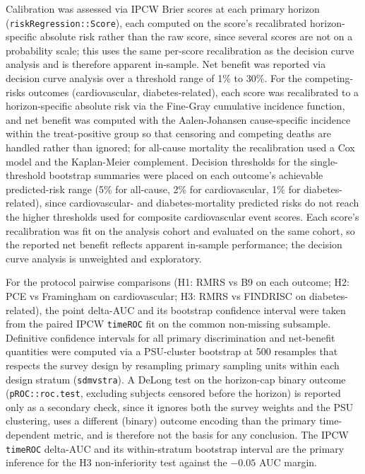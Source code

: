 \documentclass[11pt]{article}
\begin{document}
Calibration was assessed via IPCW Brier scores at each primary horizon (\texttt{riskRegression::Score}), each computed on the score's recalibrated horizon-specific absolute risk rather than the raw score, since several scores are not on a probability scale; this uses the same per-score recalibration as the decision curve analysis and is therefore apparent in-sample. Net benefit was reported via decision curve analysis \citep{vickers2006dca} over a threshold range of 1\% to 30\%. For the competing-risks outcomes (cardiovascular, diabetes-related), each score was recalibrated to a horizon-specific absolute risk via the Fine-Gray cumulative incidence function, and net benefit was computed with the Aalen-Johansen cause-specific incidence within the treat-positive group so that censoring and competing deaths are handled rather than ignored; for all-cause mortality the recalibration used a Cox model and the Kaplan-Meier complement. Decision thresholds for the single-threshold bootstrap summaries were placed on each outcome's achievable predicted-risk range (5\% for all-cause, 2\% for cardiovascular, 1\% for diabetes-related), since cardiovascular- and diabetes-mortality predicted risks do not reach the higher thresholds used for composite cardiovascular event scores. Each score's recalibration was fit on the analysis cohort and evaluated on the same cohort, so the reported net benefit reflects apparent in-sample performance; the decision curve analysis is unweighted and exploratory.

For the protocol pairwise comparisons (H1: RMRS vs B9 on each outcome; H2: PCE vs Framingham on cardiovascular; H3: RMRS vs FINDRISC on diabetes-related), the point delta-AUC and its bootstrap confidence interval were taken from the paired IPCW \texttt{timeROC} fit on the common non-missing subsample. Definitive confidence intervals for all primary discrimination and net-benefit quantities were computed via a PSU-cluster bootstrap at 500 resamples that respects the survey design by resampling primary sampling units within each design stratum (\texttt{sdmvstra}). A DeLong test on the horizon-cap binary outcome (\texttt{pROC::roc.test}, excluding subjects censored before the horizon) is reported only as a secondary check, since it ignores both the survey weights and the PSU clustering, uses a different (binary) outcome encoding than the primary time-dependent metric, and is therefore not the basis for any conclusion. The IPCW \texttt{timeROC} delta-AUC and its within-stratum bootstrap interval are the primary inference for the H3 non-inferiority test against the $-0.05$ AUC margin.
\end{document}
